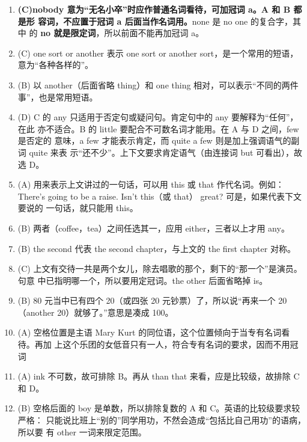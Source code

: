\begin{enumerate}
\item \textbf{(C)nobody 意为“无名小卒”时应作普通名词看待，可加冠词 a。A 和 B 都是形
    容词，不应置于冠词 a 后面当作名词用。}none 是 no one 的复合字，其中
  的 \textbf{no 就是限定词}，所以前面不能再加冠词 a。

\item (C) one sort or another 表示 one sort or another sort，是一个常用的短语，
  意为“各种各样的”。

\item (B) 以 another（后面省略 thing）和 one thing 相对，可以表示“不同的两件
  事”，也是常用短语。

\item (D) C 的 any 只适用于否定句或疑问句。肯定句中的 any 要解释为“任何”，在此
  亦不适合。B 的 little 要配合不可数名词才能用。在 A 与 D 之间，few 是否定的
  意味，a few 才能表示肯定，而 quite a few 则是加上强调语气的副词 quite 来表
  示“还不少”。上下文要求肯定语气（由连接词 but 可看出），故选 D。

\item (A) 用来表示上文讲过的一句话，可以用 this 或 that 作代名词。例如：There's
  going to be a raise. Isn't this（或 that） great? 可是，如果代表下文要说的
  一句话，就只能用 this。

\item (B) 两者（coffee，tea）之间任选其一，应用 either，三者以上才用 any。

\item (B) the second 代表 the second chapter，与上文的 the first chapter 对称。

\item (C) 上文有交待一共是两个女儿，除去唱歌的那个，剩下的“那一个”是演员。句意
  中已指明哪一个，所以要用定冠词。the other 后面省略掉 is。

\item (B) 80 元当中已有四个 20（或四张 20 元钞票）了，所以说“再来一个 20（another 20）就够了。”意思是凑成 100。

\item (A) 空格位置是主语 Mary Kurt 的同位语，这个位置倾向于当专有名词看待。再加
  上这个乐团的女低音只有一人，符合专有名词的要求，因而不用冠词

\item (A) ink 不可数，故可排除 B。再从 than that 来看，应是比较级，故排除 C 和 D。

\item (B) 空格后面的 boy 是单数，所以排除复数的 A 和 C。英语的比较级要求较严格：
  只能说比班上“别的”同学用功，不然会造成“包括比自己用功”的语病，所以要
  有 other 一词来限定范围。


\end{enumerate}
